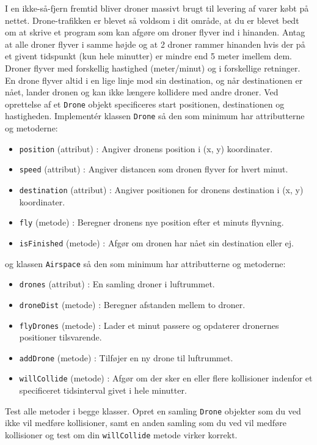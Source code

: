I en ikke-så-fjern fremtid bliver droner massivt brugt til levering af varer købt på nettet.  Drone-trafikken er blevet så voldsom i dit område, at du er blevet bedt om at skrive et program som kan afgøre om droner flyver ind i hinanden. Antag at alle droner flyver i samme højde og at 2 droner rammer hinanden hvis der på et givent tidspunkt (kun hele minutter) er mindre end 5 meter imellem dem.  Droner flyver med forskellig hastighed (meter/minut) og i forskellige retninger. En drone flyver altid i en lige linje mod sin destination, og når destinationen er nået, lander dronen og kan ikke længere kollidere med andre droner.  Ved oprettelse af et \texttt{Drone} objekt specificeres start positionen, destinationen og hastigheden.  Implementér klassen \texttt{Drone} så den som minimum har attributterne og metoderne:
    \begin{itemize}
    \item \texttt{position} (attribut) : Angiver dronens position i (x, y) koordinater.
    \item \texttt{speed} (attribut) : Angiver distancen som dronen flyver for hvert minut.
    \item \texttt{destination} (attribut) : Angiver positionen for dronens destination i (x, y) koordinater.
    \item \texttt{fly} (metode) : Beregner dronens nye position efter et minuts flyvning.
    \item \texttt{isFinished} (metode) : Afgør om dronen har nået sin destination eller ej.
    \end{itemize}
    og klassen \texttt{Airspace} så den som minimum har attributterne og metoderne:
    \begin{itemize}
    \item \texttt{drones} (attribut) : En samling droner i luftrummet.
    \item \texttt{droneDist} (metode) : Beregner afstanden mellem to droner.
    \item \texttt{flyDrones} (metode) : Lader et minut passere og opdaterer dronernes positioner tilsvarende.
    \item \texttt{addDrone} (metode) : Tilføjer en ny drone til luftrummet.
    \item \texttt{willCollide} (metode) : Afgør om der sker en eller flere kollisioner indenfor et specificeret tidsinterval givet
      i hele minutter.
    \end{itemize}
    Test alle metoder i begge klasser. Opret en samling \texttt{Drone} objekter som du ved ikke vil medføre kollisioner, samt en anden samling som du ved vil medføre kollisioner og test om din \texttt{willCollide} metode virker korrekt.
